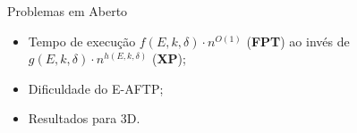 \begin{frame}{Problemas em Aberto}
  \begin{itemize}[<+->]
    \item Tempo de execução $f(E, k, \delta) \cdot n ^ {O(1)}$ (\textbf{FPT}) ao invés de $g(E, k, \delta) \cdot n ^ {h(E, k, \delta)}$ (\textbf{XP});

    \item Dificuldade do E-AFTP;

    \item Resultados para 3D.
  \end{itemize}
\end{frame}
